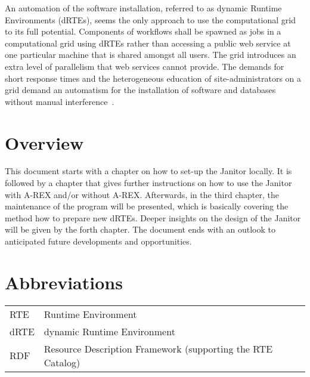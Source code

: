 An automation of the software installation, referred to as dynamic
Runtime Environments (dRTEs), seems the only approach to use the
computational grid to its full potential. Components of workflows
shall be spawned as jobs in a computational grid using dRTEs rather
than accessing a public web service at one particular machine that
is shared amongst all users.  The grid introduces an extra level of
parallelism that web services cannot provide. The demands for short
response times and the heterogeneous education of site-administrators
on a grid demand an automatism for the installation of software and
databases without manual interference~\cite{BAYER_2007}.

\section{Overview}

This document starts with a chapter on how to set-up the Janitor
locally. It is followed by a chapter that gives further instructions on
how to use the Janitor with A-REX and/or without A-REX. Afterwards, in the
third chapter, the maintenance of the program will be presented, which is
basically covering the method how to prepare new dRTEs. Deeper insights on
the design of the Janitor will be given by the forth chapter. The document
ends with an outlook to anticipated future developments and opportunities.

\section*{Abbreviations}

\begin{tabular}{l@{--}p{150mm}}
RTE&Runtime Environment\\
dRTE&dynamic Runtime Environment\\
RDF&Resource Description Framework (supporting the RTE Catalog)\\
\end{tabular}






 

